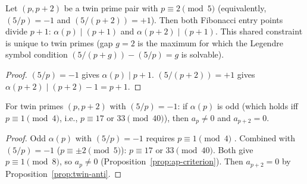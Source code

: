 \begin{proposition}
\label{prop:twin-fibonacci}
Let $(p, p{+}2)$ be a twin prime pair with $p \equiv 2 \pmod{5}$
(equivalently, $(5/p) = -1$ and $(5/(p{+}2)) = +1$).
Then both Fibonacci entry points divide $p + 1$:
$\alpha(p) \mid (p{+}1)$ and $\alpha(p{+}2) \mid (p{+}1)$.
This shared constraint is unique to twin primes
(gap $g = 2$ is the maximum for which the Legendre symbol
condition $(5/(p{+}g)) - (5/p) = g$ is solvable).
\end{proposition}

\begin{proof}
$(5/p) = -1$ gives $\alpha(p) \mid p + 1$.
$(5/(p{+}2)) = +1$ gives $\alpha(p{+}2) \mid (p{+}2) - 1 = p + 1$.
\end{proof}

\begin{corollary}
\label{prop:complementarity}
For twin primes $(p, p{+}2)$ with $(5/p) = -1$:
if $\alpha(p)$ is odd (which holds iff $p \equiv 1 \pmod{4}$,
i.e., $p \equiv 17$ or $33 \pmod{40}$),
then $a_p \ne 0$ and $a_{p+2} = 0$.
\end{corollary}

\begin{proof}
Odd $\alpha(p)$ with $(5/p) = -1$ requires
$p \equiv 1 \pmod{4}$ \citep{Ribenboim1996}.
Combined with $(5/p) = -1$ ($p \equiv \pm 2 \pmod 5$):
$p \equiv 17$ or $33 \pmod{40}$.
Both give $p \equiv 1 \pmod{8}$, so $a_p \ne 0$
(Proposition~\ref{prop:ap-criterion}).
Then $a_{p+2} = 0$ by
Proposition~\ref{prop:twin-anti}.
\end{proof}

